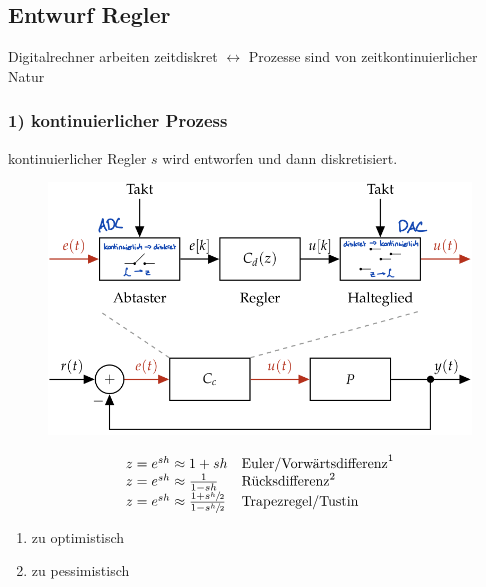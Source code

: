 \documentclass[
  10pt,
  a4paper,
  twocolumn]{article}
\providecommand{\tightlist}{%
  \setlength{\itemsep}{0pt}\setlength{\parskip}{0pt}}\usepackage{longtable,booktabs,array}
\numberwithin{equation}{section}
\begin{document}
\hypertarget{entwurf-regler}{%
\subsection{Entwurf Regler}\label{entwurf-regler}}

Digitalrechner arbeiten zeitdiskret \(\leftrightarrow\) Prozesse sind
von zeitkontinuierlicher Natur

\hypertarget{kontinuierlicher-prozess}{%
\subsubsection{1) kontinuierlicher
Prozess}\label{kontinuierlicher-prozess}}

kontinuierlicher Regler \(s\) wird entworfen und dann diskretisiert.

\begin{figure}[H]

{\centering \includegraphics{images/paste-58.png}

}

\end{figure}

\[
\begin{array}{ll}
  z = e^{sh} \approx 1+sh & \text{Euler/Vorwärtsdifferenz}^1 \\
  z = e^{sh} \approx \frac1{1-sh} & \text{Rücksdifferenz}^2 \\
  z = e^{sh} \approx \frac{1+s\sfrac{h}{2}}{1-s\sfrac{h}{2}} & \text{Trapezregel/Tustin} \\
\end{array}
\]

\small

\begin{enumerate}
\def\labelenumi{\arabic{enumi}.}
\tightlist
\item
  zu optimistisch
\item
  zu pessimistisch
\end{enumerate}
\end{document}
